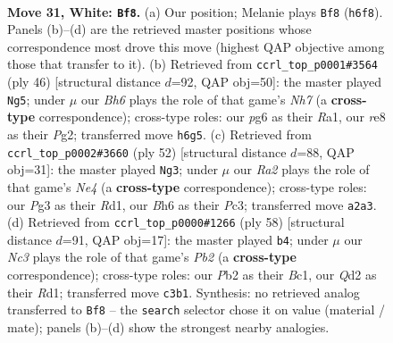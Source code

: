 \documentclass[11pt]{article}
\begin{document}
\clearpage

\begin{figure}[p]\centering
\begin{subfigure}{0.46\textwidth}\centering
\resizebox{\linewidth}{!}{%
\newchessgame
\chessboard[
  setfen={r2qr3/ppp4k/5ppB/3b3p/Pb6/2N3P1/RPPQ1P1P/6K1 w - - 0 31},
  showmover=false,
  pgfstyle=straightmove, color=movearrow, markmove={h6-f8}
]}
\caption{}
\end{subfigure}\hfill
\begin{subfigure}{0.46\textwidth}\centering
\resizebox{\linewidth}{!}{%
\newchessgame
\chessboard[
  setfen={r1b3k1/1p3qpN/7B/p1b2p2/P7/2P3Q1/1P3PPP/R5K1 w - - 0 24},
  showmover=false,
  pgfstyle=straightmove, color=movearrow, markmove={h7-g5}
]}
\caption{}
\end{subfigure}
\\[4pt]
\begin{subfigure}{0.46\textwidth}\centering
\resizebox{\linewidth}{!}{%
\newchessgame
\chessboard[
  setfen={4b1k1/4b1p1/r1q2p1p/Bp2p3/1P2N3/2PQ4/1P3PPP/3R2K1 w - - 4 27},
  showmover=false,
  pgfstyle=straightmove, color=movearrow, markmove={e4-g3}
]}
\caption{}
\end{subfigure}\hfill
\begin{subfigure}{0.46\textwidth}\centering
\resizebox{\linewidth}{!}{%
\newchessgame
\chessboard[
  setfen={3q2k1/3r1pp1/p3bb2/1p5p/4P3/P3NP2/1P2Q1PP/2BR2K1 w - - 0 30},
  showmover=false,
  pgfstyle=straightmove, color=movearrow, markmove={b2-b4}
]}
\caption{}
\end{subfigure}
\caption{\textbf{Move 31, White: \texttt{Bf8}.} (a) Our position; Melanie plays \texttt{Bf8} (\texttt{h6f8}). Panels (b)--(d) are the retrieved master positions whose correspondence most drove this move (highest QAP objective among those that transfer to it). (b) Retrieved from \texttt{ccrl\_top\_p0001\#3564} (ply 46) [structural distance $d$=92, QAP obj=50]: the master played \texttt{Ng5}; under $\mu$ our \emph{Bh6} plays the role of that game's \emph{Nh7} (a \textbf{cross-type} correspondence); cross-type roles: our \emph{p}g6 as their \emph{R}a1, our \emph{r}e8 as their \emph{P}g2; transferred move \texttt{h6g5}. (c) Retrieved from \texttt{ccrl\_top\_p0002\#3660} (ply 52) [structural distance $d$=88, QAP obj=31]: the master played \texttt{Ng3}; under $\mu$ our \emph{Ra2} plays the role of that game's \emph{Ne4} (a \textbf{cross-type} correspondence); cross-type roles: our \emph{P}g3 as their \emph{R}d1, our \emph{B}h6 as their \emph{P}c3; transferred move \texttt{a2a3}. (d) Retrieved from \texttt{ccrl\_top\_p0000\#1266} (ply 58) [structural distance $d$=91, QAP obj=17]: the master played \texttt{b4}; under $\mu$ our \emph{Nc3} plays the role of that game's \emph{Pb2} (a \textbf{cross-type} correspondence); cross-type roles: our \emph{P}b2 as their \emph{B}c1, our \emph{Q}d2 as their \emph{R}d1; transferred move \texttt{c3b1}. Synthesis: no retrieved analog transferred to \texttt{Bf8} -- the \texttt{search} selector chose it on value (material / mate); panels (b)--(d) show the strongest nearby analogies.}
\label{fig:thought-m60}
\end{figure}
\end{document}
